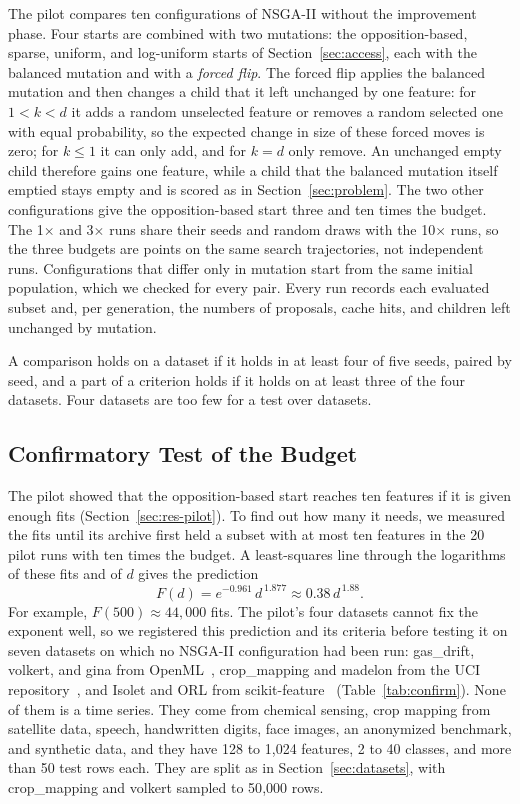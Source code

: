 The pilot compares ten configurations of NSGA-II without the improvement phase. Four starts are combined with two mutations: the opposition-based, sparse, uniform, and log-uniform starts of Section~\ref{sec:access}, each with the balanced mutation and with a \emph{forced flip}. The forced flip applies the balanced mutation and then changes a child that it left unchanged by one feature: for $1 < k < d$ it adds a random unselected feature or removes a random selected one with equal probability, so the expected change in size of these forced moves is zero; for $k \leq 1$ it can only add, and for $k = d$ only remove. An unchanged empty child therefore gains one feature, while a child that the balanced mutation itself emptied stays empty and is scored as in Section~\ref{sec:problem}. The two other configurations give the opposition-based start three and ten times the budget. The 1$\times$ and 3$\times$ runs share their seeds and random draws with the 10$\times$ runs, so the three budgets are points on the same search trajectories, not independent runs. Configurations that differ only in mutation start from the same initial population, which we checked for every pair. Every run records each evaluated subset and, per generation, the numbers of proposals, cache hits, and children left unchanged by mutation.

A comparison holds on a dataset if it holds in at least four of five seeds, paired by seed, and a part of a criterion holds if it holds on at least three of the four datasets. Four datasets are too few for a test over datasets.

\subsection{Confirmatory Test of the Budget}
\label{sec:confirm}

The pilot showed that the opposition-based start reaches ten features if it is given enough fits (Section~\ref{sec:res-pilot}). To find out how many it needs, we measured the fits until its archive first held a subset with at most ten features in the 20 pilot runs with ten times the budget. A least-squares line through the logarithms of these fits and of $d$ gives the prediction
\begin{equation}
  F(d) = e^{-0.961}\, d^{\,1.877} \approx 0.38\, d^{\,1.88} .
  \label{eq:confirm}
\end{equation}
For example, $F(500) \approx 44{,}000$ fits. The pilot's four datasets cannot fix the exponent well, so we registered this prediction and its criteria before testing it on seven datasets on which no NSGA-II configuration had been run: gas\_drift, volkert, and gina from OpenML~\cite{Vanschoren2014OpenML}, crop\_mapping and madelon from the UCI repository~\cite{Kelly2023UCI}, and Isolet and ORL from scikit-feature~\cite{Li2017ScikitFeature} (Table~\ref{tab:confirm}). None of them is a time series. They come from chemical sensing, crop mapping from satellite data, speech, handwritten digits, face images, an anonymized benchmark, and synthetic data, and they have 128 to 1{,}024 features, 2 to 40 classes, and more than 50 test rows each. They are split as in Section~\ref{sec:datasets}, with crop\_mapping and volkert sampled to 50{,}000 rows.


